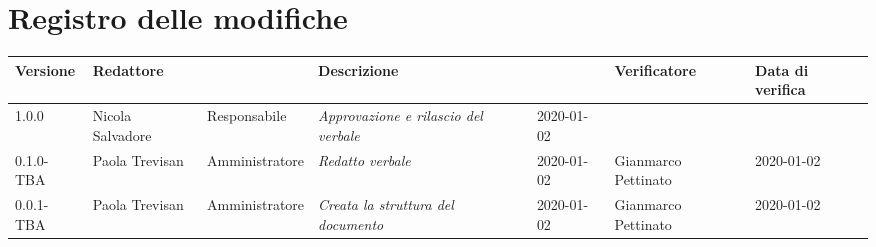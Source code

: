 \section*{Registro delle modifiche}
\renewcommand{\arraystretch}{1.8}
  \setlength\LTleft{-1.7cm}
  \begin{longtable}{|p{1.7cm}|p{2cm}|p{2.5cm}|p{3cm}|p{1.7cm}|p{2cm}|p{2.3cm}|}
    \hline
    \rowcolor{header}
    \textbf{Versione} & \textbf{Redattore} & \centering{\textbf{Ruolo}} & \textbf{Descrizione} &      \centering{\textbf{Data}} & \textbf{Verificatore} & \textbf{Data di verifica} \\
    \hline
    1.0.0 & Nicola Salvadore & Responsabile & \small{\textit{Approvazione e rilascio del verbale}} & 2020-01-02 & & \\
	0.1.0-TBA & Paola Trevisan & Amministratore & \small{\textit{Redatto verbale}} & 2020-01-02 & Gianmarco Pettinato & 2020-01-02 \\
    0.0.1-TBA & Paola Trevisan & Amministratore & \small{\textit{Creata la struttura del documento}} & 2020-01-02 & Gianmarco Pettinato & 2020-01-02 \\

    \hline
  \end{longtable}
